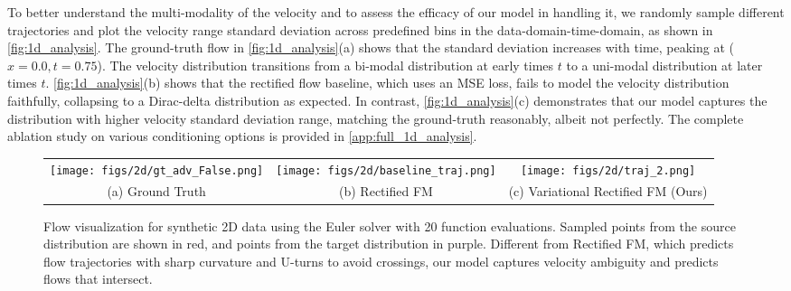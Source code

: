 To better understand the multi-modality of the velocity and to assess the efficacy of our model in handling it, we randomly sample different trajectories and plot the velocity range standard deviation across predefined bins in the data-domain-time-domain, as shown in \cref{fig:1d_analysis}. The ground-truth flow in \cref{fig:1d_analysis}(a) shows that the standard deviation increases with time, peaking at (\(x=0.0, t=0.75\)). The velocity distribution transitions from a bi-modal distribution at early times \(t\) to a uni-modal distribution at later times \(t\). %
\cref{fig:1d_analysis}(b) shows that the rectified flow baseline, which uses  an MSE loss, fails to model the velocity distribution faithfully, collapsing to a Dirac-delta distribution as expected. 
In contrast, \cref{fig:1d_analysis}(c) demonstrates that our model  captures the  distribution with higher velocity standard deviation range,  matching the ground-truth  reasonably, albeit not perfectly.
The complete ablation study on various conditioning options is provided in \cref{app:full_1d_analysis}.










\begin{figure*}[t]
    \centering
    \setlength{\tabcolsep}{1pt}
    \begin{tabular}{ccc}
    \texttt{[image: figs/2d/gt\_adv\_False.png]} &
    \texttt{[image: figs/2d/baseline\_traj.png]} &
    \texttt{[image: figs/2d/traj\_2.png]} \vspace{-0.8em} \\
    
    (a) Ground Truth &(b) Rectified FM &(c) Variational Rectified FM (Ours)
    \end{tabular}
    \vspace{-0.8em}
    \caption{Flow  visualization for synthetic 2D data using the Euler solver with 20 function evaluations. Sampled points from the source distribution are shown in red, and points from the target distribution in purple. Different from Rectified FM, which predicts flow trajectories with sharp curvature and  U-turns to avoid crossings, our model  captures velocity ambiguity and predicts flows that  intersect. %
    }
    \vspace{-1.em}
    \label{fig:2d_result}
\end{figure*}

